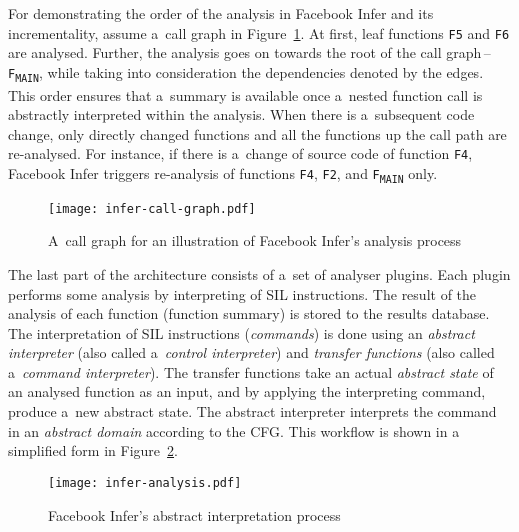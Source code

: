 \begin{example}
    \label{ex:fbinferAnalysis}
    For demonstrating the order of the analysis in Facebook Infer and its
    incrementality, assume a~call graph in Figure~\ref{fig:inferCallGraph}. At
    first, leaf functions \texttt{F5} and \texttt{F6} are analysed. Further,
    the analysis goes on towards the root of the call
    graph\,--\,\texttt{F\textsubscript{MAIN}}, while taking into consideration
    the dependencies denoted by the edges. This order ensures that a~summary is
    available once a~nested function call is abstractly interpreted within the
    analysis. When there is a~subsequent code change, only directly changed
    functions and all the functions up the call path are re-analysed. For
    instance, if there is a~change of source code of function \texttt{F4},
    Facebook Infer triggers re-analysis of functions \texttt{F4}, \texttt{F2},
    and \texttt{F\textsubscript{MAIN}} only.
\end{example}

\begin{figure}[hbt]
    \centering
    \texttt{[image: infer-call-graph.pdf]}
    \caption{%
        A~call graph for an illustration of Facebook Infer's analysis
        process~\cite{harmimBP, excel2019FBInfer, projectPracticeMarcin2018}%
    }
    \label{fig:inferCallGraph}
\end{figure}

The last part of the architecture consists of a~set of analyser plugins. Each
plugin performs some analysis by interpreting of SIL instructions. The result
of the analysis of each function (function summary) is stored to the results
database. The interpretation of SIL instructions (\emph{commands}) is done using
an \emph{abstract interpreter} (also called a~\emph{control interpreter}) and
\emph{transfer functions} (also called a~\emph{command interpreter}). The
transfer functions take an actual \emph{abstract state} of an analysed function
as an input, and by applying the interpreting command, produce a~new abstract
state. The abstract interpreter interprets the command in an \emph{abstract
domain} according to the CFG. This workflow is shown in a simplified form in
Figure~\ref{fig:inferAnalysis}.

\begin{figure}[hbt]
    \centering
    \texttt{[image: infer-analysis.pdf]}
    \caption{%
        Facebook Infer's abstract interpretation
        process~\cite{harmimBP, projectPracticeMarcin2018}%
    }
    \label{fig:inferAnalysis}
\end{figure}

